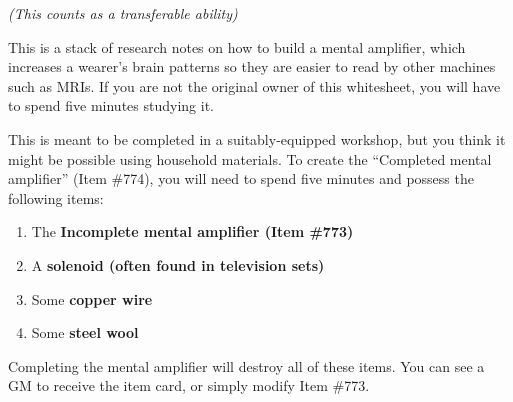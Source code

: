 \documentclass[white]{guildcamp1}
\begin{document}
\name{\wMentalAmplifier{}}

\emph{(This counts as a transferable ability)}

This is a stack of research notes on how to build a mental amplifier, which increases a wearer's brain patterns so they are easier to read by other machines such as MRIs. If you are not the original owner of this whitesheet, you will have to spend five minutes studying it.

This is meant to be completed in a suitably-equipped workshop, but you think it might be possible using household materials. To create the ``Completed mental amplifier'' (Item \#774), you will need to spend five minutes and possess the following items:

\begin{enumerate}
\item The  \bf{Incomplete mental amplifier} (Item \#773)
\item A \bf{solenoid} (often found in television sets)
\item Some \bf{copper wire}
\item Some \bf{steel wool}
\end{enumerate}

Completing the mental amplifier will destroy all of these items. You can see a GM to receive the item card, or simply modify Item \#773.
\end{document}
